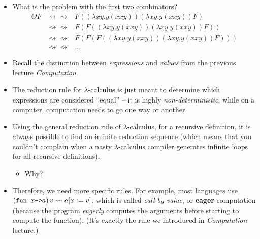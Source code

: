 \documentclass{beamer}
\newcommand{\assign}{:=}
\newcommand{\tmem}[1]{{\em #1\/}}
\newcommand{\tmstrong}[1]{\textbf{#1}}
\newcommand{\tmverbatim}[1]{\text{{\ttfamily{#1}}}}
\begin{document}
\begin{itemize}
  \item What is the problem with the first two combinators?
  \begin{eqnarray*}
    \Theta F & \rightsquigarrow \rightsquigarrow & F ((\lambda x y.y (x x y)) 
    (\lambda x y.y (x x y)) F)\\
    & \rightsquigarrow \rightsquigarrow & F (F ((\lambda x y.y (x x y)) 
    (\lambda x y.y (x x y)) F))\\
    & \rightsquigarrow \rightsquigarrow & F (F (F ((\lambda x y.y (x x y)) 
    (\lambda x y.y (x x y)) F)))\\
    & \rightsquigarrow \rightsquigarrow & \ldots
  \end{eqnarray*}
  \item Recall the distinction between {\tmem{expressions}} and
  {\tmem{values}} from the previous lecture {\tmem{Computation}}.
  
  \item The reduction rule for $\lambda$-calculus is just meant to determine
  which expressions are considered ``equal'' -- it is highly
  {\tmem{non-deterministic}}, while on a computer, computation needs to go one
  way or another.
  
  \item Using the general reduction rule of $\lambda$-calculus, for a
  recursive definition, it is always possible to find an infinite reduction
  sequence {\small{(which means that you couldn't complain when a nasty
  $\lambda$-calculus compiler generates infinite loops for all recursive
  definitions)}}.
  \begin{itemize}
    \item Why?
  \end{itemize}
  \item Therefore, we need more specific rules. For example, most languages
  use $\left( \text{\tmverbatim{fun }} x \text{\tmverbatim{->}} a \right) v
  \rightsquigarrow a [x \assign v]$, which is called {\tmem{call-by-value}},
  or {\tmstrong{eager}} computation (because the program {\tmem{eagerly}}
  computes the arguments before starting to compute the function). (It's
  exactly the rule we introduced in {\tmem{Computation}} lecture.)
  

\end{itemize}
\end{document}
